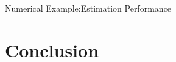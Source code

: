 \documentclass[10pt]{beamer}
\newlength\figureheight
\newlength\figurewidth
\newcommand{\tikzdir}[1]{#1.tikz}
\newcommand{\inputtikz}[1]{}}
\begin{document}
  \begin{frame}{Numerical Example:Estimation Performance}
    \begin{figure}[ht]
      \begin{center}
        \setlength{\figureheight}{5cm}
        \setlength{\figurewidth}{6cm}
        \inputtikz{variance}
      \end{center}
      \label{fig:variance}
    \end{figure}
  \end{frame}


  \section{Conclusion}
\end{document}
